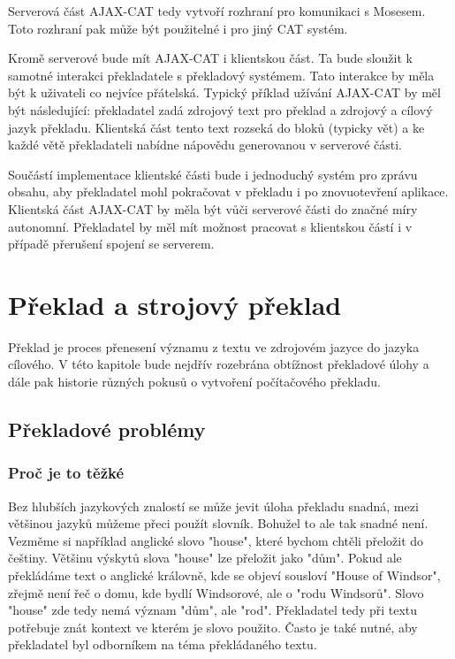 \documentclass[12pt,a4paper]{report}
\begin{document}
Serverová část AJAX-CAT tedy vytvoří rozhraní pro komunikaci s Mosesem. Toto rozhraní pak může být použitelné i pro jiný CAT systém.

Kromě serverové bude mít AJAX-CAT i klientskou část. Ta bude sloužit k samotné interakci překladatele s překladový systémem. Tato interakce by měla být k uživateli co nejvíce přátelská. Typický příklad užívání AJAX-CAT by měl být následující: překladatel zadá zdrojový text pro překlad a zdrojový a cílový jazyk překladu. Klientská část tento text rozseká do bloků (typicky vět) a ke každé větě překladateli nabídne nápovědu generovanou v serverové části.

Součástí implementace klientské části bude i jednoduchý systém pro zprávu obsahu, aby překladatel mohl pokračovat v překladu i po znovuotevření aplikace. Klientská část AJAX-CAT by měla být vůči serverové části do značné míry autonomní. Překladatel by měl mít možnost pracovat s klientskou částí i v případě přerušení spojení se serverem.


\chapter{Překlad a strojový překlad}

Překlad je proces přenesení významu z textu ve zdrojovém jazyce do jazyka cílového. V této kapitole bude nejdřív rozebrána obtížnost překladové úlohy a dále pak historie různých pokusů o vytvoření počítačového překladu.

\section{Překladové problémy}

\subsection{Proč je to těžké}
Bez hlubších jazykových znalostí se může jevit úloha překladu snadná, mezi většinou jazyků můžeme přeci použít slovník. Bohužel to ale tak snadné není. Vezměme si například anglické slovo "house", které bychom chtěli přeložit do češtiny. Většinu výskytů slova "house" lze přeložit jako "dům". Pokud ale překládáme text o anglické královně, kde se objeví sousloví "House of Windsor", zřejmě není řeč o domu, kde bydlí Windsorové, ale o "rodu Windsorů". Slovo "house" zde tedy nemá význam "dům", ale "rod". Překladatel tedy při textu potřebuje znát kontext ve kterém je slovo použito. Často je také nutné, aby překladatel byl odborníkem na téma překládaného textu.
\end{document}
